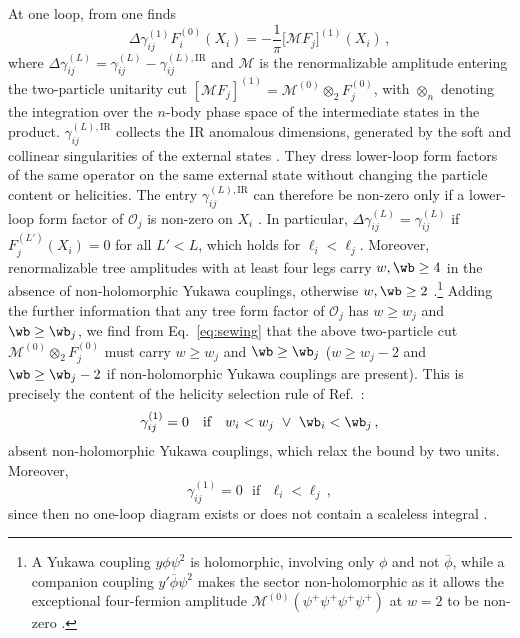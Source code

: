 At one loop, from  one finds \cite{Caron-Huot:2016cwu}
\begin{equation}
    \Delta\gamma^{(1)}_{i j}F^{(0)}_i(X_i) = -\frac{1}{\pi}\big[\mathcal M F_j\big]^{(1)}(X_i)\,,
\end{equation}
where $\Delta\gamma_{i j}^{(L)} = \gamma_{i j}^{(L)} - \gamma_{ij}^{(L),\mathrm{IR}}$ and $\mathcal M$ is the renormalizable amplitude entering the two-particle unitarity cut $[\mathcal M F_j]^{(1)} = \mathcal M^{(0)} \otimes_2  F_j^{(0)}$, 
with $\otimes_n$ denoting the integration over the $n$-body phase space of the intermediate states in the product.
$\gamma_{ij}^{(L),\mathrm{IR}}$ collects the IR anomalous dimensions, generated by the soft and collinear singularities of the external states \cite{Sterman:2002qn,Becher:2009cu,Chiu:2009mg}. They dress lower-loop form factors of the same operator on the same external state without changing the particle content or helicities.
The entry $\gamma^{(L),\text{IR}}_{ij}$ can therefore be non-zero only if a lower-loop form factor of $\mathcal O_j$ is non-zero on $X_i$ \cite{Catani:1998bh}. In particular, $\Delta\gamma_{ij}^{(L)} = \gamma_{ij}^{(L)}$ if $F^{(L')}_j(X_i)=0$ for all $L'<L$, which holds for $\ell_i < \ell_j$.
Moreover, renormalizable tree amplitudes with at least four legs carry $w,\wb \ge 4$ in the absence of non-holomorphic Yukawa couplings, otherwise $w,\wb \ge 2$ \cite{Cheung:2015aba}.\footnote{A Yukawa coupling $y\phi\psi^2$ is holomorphic, involving only $\phi$ and not $\overline\phi$, while a companion coupling $y'\overline\phi\psi^2$ makes the sector non-holomorphic as it allows the exceptional four-fermion amplitude $\mathcal M^{(0)}(\psi^+\psi^+\psi^+\psi^+)$ at $w=2$ to be non-zero \cite{Cheung:2015aba}.}
Adding the further information that any tree form factor of $\mathcal O_j$ has $w \ge w_j$ and $\wb \ge \wb_j$, we find from Eq.~\eqref{eq:sewing} that the above two-particle cut $\mathcal M^{(0)} \otimes_2  F_j^{(0)}$ must carry $w\ge w_j$ and $\wb\ge \wb_j$ ($w\ge w_j-2$ and $\wb\ge \wb_j-2$ if non-holomorphic Yukawa couplings are present).
This is precisely the content of the helicity selection rule of Ref.~\cite{Cheung:2015aba}:
\begin{equation}
    \gamma_{ij}^{(1)} = 0 \ \ \ \text{if} \ \ \ w_i < w_j \ \lor  \ \wb_i < \wb_j\,,
    \label{eq:1lhsr}
\end{equation}
absent non-holomorphic Yukawa couplings, which relax the bound by two units.
Moreover,
\begin{equation}
    \gamma_{ij}^{(1)} = 0 \ \ \ \text{if} \ \ \  \ell_i < \ell_j\,,
\end{equation}
since then no one-loop diagram exists or does not contain a scaleless integral \cite{Bern:2019wie}.

